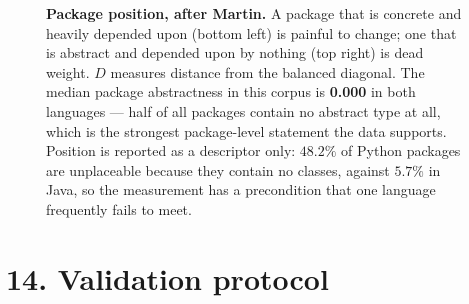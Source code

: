 \documentclass[11pt]{article}
\begin{document}
\begin{figure}[h]
\caption{\textbf{Package position, after Martin.} A package that is concrete and heavily
depended upon (bottom left) is painful to change; one that is abstract and depended upon by
nothing (top right) is dead weight. $D$ measures distance from the balanced diagonal. The
median package abstractness in this corpus is \textbf{0.000} in both languages --- half of all
packages contain no abstract type at all, which is the strongest package-level statement the
data supports. Position is reported as a descriptor only: $48.2\%$ of Python packages are
unplaceable because they contain no classes, against $5.7\%$ in Java, so the measurement has a
precondition that one language frequently fails to meet.}
\end{figure}

\clearpage

\section*{14. Validation protocol}
\end{document}

